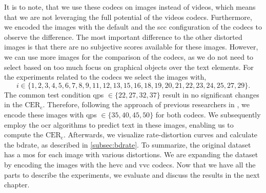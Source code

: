 It is to note, that we use these codecs on images instead of videos, which means that we are not leveraging the full potential of the videos codecs.
Furthermore, we encoded the images with the default and the \gls{scc} configuration of the codecs to observe the difference.
The most important difference to the other distorted images is that there are no subjective scores available for these images.
However, we can use more images for the comparison of the codecs, as we do not need to select based on too much focus on graphical objects over the text elements.
For the experiments related to the codecs we select the images with,
\begin{equation}
    i \in \{1, 2, 3, 4, 5, 6, 7, 8, 9, 11, 12, 13, 15, 16, 18, 19, 20, 21, 22, 23, 24, 25, 27, 29\}.
\end{equation}
The common test condition \glspl{qp} $\in \{22, 27, 32, 37\}$ result in no significant changes in the $\text{CER}_{\text{c}}$.
Therefore, following the approach of previous researchers in \cite{ultra_low_bitrate_2022}, we encode these images with \glspl{qp} $\in \{35, 40, 45, 50\}$ for both codecs.
We subsequently employ the \gls{ocr} algorithms to predict text in these images, enabling us to compute the $\text{CER}_{\text{c}}$.
Afterwards, we visualize rate-distortion curves and calculate the \gls{bdrate}, as described in \autoref{subsec:bdrate}.
To summarize, the original dataset has a \gls{mos} for each image with various distortions.
We are expanding the dataset by encoding the images with the \gls{hevc} and \gls{vvc} codecs.
Now that we have all the parts to describe the experiments, we evaluate and discuss the results in the next chapter.
